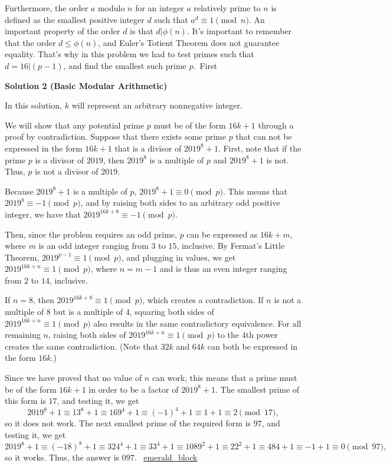 \begin{enumerate}
 Furthermore, the order $a$ modulo $n$ for an integer $a$ relatively prime to $n$ is defined as the smallest positive integer $d$ such that $a^{d} \equiv 1\pmod n$. An important property of the order $d$ is that $d|\phi(n)$. It's important to remember that the order $d \leq \phi(n)$, and Euler's Totient Theorem does not guarantee equality. That's why in this problem we had to test primes such that $d=16 | (p-1)$, and find the smallest such prime $p$.~First

 



\textbf{Solution 2 (Basic Modular Arithmetic)}

In this solution, $k$ will represent an arbitrary nonnegative integer.

 We will show that any potential prime $p$ must be of the form $16k+1$ through a proof by contradiction. Suppose that there exists some prime $p$ that can not be expressed in the form $16k+1$ that is a divisor of $2019^8+1$. First, note that if the prime $p$ is a divisor of $2019$, then $2019^8$ is a multiple of $p$ and $2019^8+1$ is not. Thus, $p$ is not a divisor of $2019$.

 Because $2019^8+1$ is a multiple of $p$, $2019^8+1\equiv0\pmod{p}$. This means that $2019^8\equiv-1\pmod{p}$, and by raising both sides to an arbitrary odd positive integer, we have that $2019^{16k+8}\equiv-1\pmod{p}$.

 Then, since the problem requires an odd prime, $p$ can be expressed as $16k+m$, where $m$ is an odd integer ranging from $3$ to $15$, inclusive. By Fermat's Little Theorem, $2019^{p-1}\equiv1\pmod{p}$, and plugging in values, we get $2019^{16k+n}\equiv1\pmod{p}$, where $n=m-1$ and is thus an even integer ranging from $2$ to $14$, inclusive.

 If $n=8$, then $2019^{16k+8}\equiv1\pmod{p}$, which creates a contradiction. If $n$ is not a multiple of $8$ but is a multiple of $4$, squaring both sides of $2019^{16k+n}\equiv1\pmod{p}$ also results in the same contradictory equivalence. For all remaining $n$, raising both sides of $2019^{16k+n}\equiv1\pmod{p}$ to the $4$th power creates the same contradiction. (Note that $32k$ and $64k$ can both be expressed in the form $16k$.)

 Since we have proved that no value of $n$ can work, this means that a prime must be of the form $16k+1$ in order to be a factor of $2019^8+1$. The smallest prime of this form is $17$, and testing it, we get
 \[2019^8+1\equiv13^8+1\equiv169^4+1\equiv(-1)^4+1\equiv1+1\equiv2\pmod{17},\]so it does not work. The next smallest prime of the required form is $97$, and testing it, we get
 \[2019^8+1\equiv(-18)^8+1\equiv324^4+1\equiv33^4+1\equiv1089^2+1\equiv22^2+1\equiv484+1\equiv-1+1\equiv0\pmod{97},\]so it works. Thus, the answer is $\boxed{097}$. ~\href{https://artofproblemsolving.com/wiki/index.php?title=User:Emerald\_block}{emerald\_block}


\end{enumerate}
